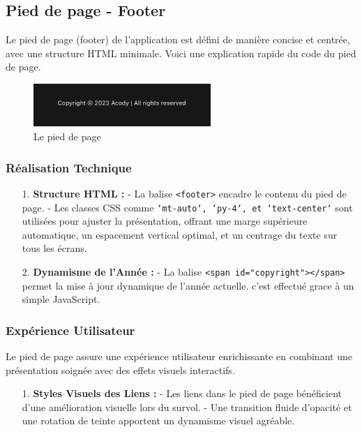 \documentclass[12pt, a4paper, oneside]{thesis}
\begin{document}
\newpage
\subsection{Pied de page - Footer}
Le pied de page (footer) de l'application est défini de manière concise et centrée, 
avec une structure HTML minimale. Voici une explication rapide du code du pied de page.

\begin{figure}[h]
  \centering
  \includegraphics[width=0.6\textwidth]{images/PiedDePage.png}
  \caption{Le pied de page}
\end{figure}

\subsubsection{Réalisation Technique}
\begin{enumerate}
  \item[1.] \textbf{Structure HTML :}
  \newline- La balise \texttt{<footer>} encadre le contenu du pied de page.\newline
  - Les classes CSS comme \texttt{`mt-auto`, `py-4`, et `text-center`} sont utilisées pour ajuster la présentation, offrant une marge supérieure automatique, un espacement vertical optimal, et un centrage du texte sur tous les écrans.


  \item[2.] \textbf{Dynamisme de l'Année :}
  \newline
  - La balise \texttt{<span id="copyright"></span>} permet la mise à jour dynamique de l'année actuelle. c'est effectué grace à un simple JavaScript.
\end{enumerate}

\subsubsection{Expérience Utilisateur}
Le pied de page assure une expérience utilisateur enrichissante en combinant une présentation soignée avec des effets visuels interactifs.

\begin{enumerate}
  \item[1.] \textbf{Styles Visuels des Liens :}
  \newline - Les liens dans le pied de page bénéficient d'une amélioration visuelle lors du survol.\newline
  - Une transition fluide d'opacité et une rotation de teinte apportent un dynamisme visuel agréable.
\end{enumerate}
\end{document}
